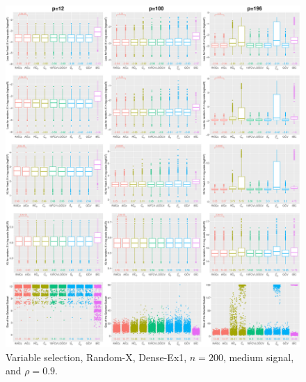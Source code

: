\begin{figure}[!ht]
\centering
\includegraphics[width=\textwidth]{figures/supplement/randomx/subset_selection/Dense-Ex1_n200_msnr_rho09.eps}
\caption{Variable selection, Random-X, Dense-Ex1, $n=200$, medium signal, and $\rho=0.9$.}
\end{figure}
\clearpage

